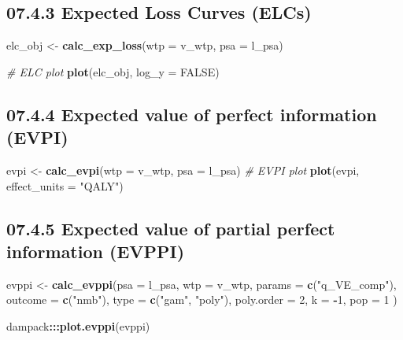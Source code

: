 \documentclass[]{article}
\newenvironment{Shaded}{\begin{snugshade}}{\end{snugshade}}
\newcommand{\KeywordTok}[1]{\textcolor[rgb]{0.13,0.29,0.53}{\textbf{#1}}}
\newcommand{\DataTypeTok}[1]{\textcolor[rgb]{0.13,0.29,0.53}{#1}}
\newcommand{\DecValTok}[1]{\textcolor[rgb]{0.00,0.00,0.81}{#1}}
\newcommand{\StringTok}[1]{\textcolor[rgb]{0.31,0.60,0.02}{#1}}
\newcommand{\CommentTok}[1]{\textcolor[rgb]{0.56,0.35,0.01}{\textit{#1}}}
\newcommand{\OtherTok}[1]{\textcolor[rgb]{0.56,0.35,0.01}{#1}}
\newcommand{\OperatorTok}[1]{\textcolor[rgb]{0.81,0.36,0.00}{\textbf{#1}}}
\newcommand{\NormalTok}[1]{#1}
\begin{document}
\subsection{07.4.3 Expected Loss Curves
(ELCs)}\label{expected-loss-curves-elcs}

\begin{Shaded}
\begin{Highlighting}[]
\NormalTok{elc_obj <-}\StringTok{ }\KeywordTok{calc_exp_loss}\NormalTok{(}\DataTypeTok{wtp =}\NormalTok{ v_wtp, }\DataTypeTok{psa =}\NormalTok{ l_psa)}

\CommentTok{# ELC plot}
\KeywordTok{plot}\NormalTok{(elc_obj, }\DataTypeTok{log_y =} \OtherTok{FALSE}\NormalTok{)}
\end{Highlighting}
\end{Shaded}

\subsection{07.4.4 Expected value of perfect information
(EVPI)}\label{expected-value-of-perfect-information-evpi}

\begin{Shaded}
\begin{Highlighting}[]
\NormalTok{evpi <-}\StringTok{ }\KeywordTok{calc_evpi}\NormalTok{(}\DataTypeTok{wtp =}\NormalTok{ v_wtp, }\DataTypeTok{psa =}\NormalTok{ l_psa)}
\CommentTok{# EVPI plot}
\KeywordTok{plot}\NormalTok{(evpi, }\DataTypeTok{effect_units =} \StringTok{"QALY"}\NormalTok{) }
\end{Highlighting}
\end{Shaded}

\subsection{07.4.5 Expected value of partial perfect information
(EVPPI)}\label{expected-value-of-partial-perfect-information-evppi}

\begin{Shaded}
\begin{Highlighting}[]
\NormalTok{evppi <-}\StringTok{ }\KeywordTok{calc_evppi}\NormalTok{(}\DataTypeTok{psa =}\NormalTok{ l_psa, }
                    \DataTypeTok{wtp =}\NormalTok{ v_wtp, }
                    \DataTypeTok{params =} \KeywordTok{c}\NormalTok{(}\StringTok{"q_VE_comp"}\NormalTok{), }
                    \DataTypeTok{outcome =} \KeywordTok{c}\NormalTok{(}\StringTok{"nmb"}\NormalTok{),}
                    \DataTypeTok{type =} \KeywordTok{c}\NormalTok{(}\StringTok{"gam"}\NormalTok{, }\StringTok{"poly"}\NormalTok{),}
                    \DataTypeTok{poly.order =} \DecValTok{2}\NormalTok{,}
                    \DataTypeTok{k =} \OperatorTok{-}\DecValTok{1}\NormalTok{,}
                    \DataTypeTok{pop =} \DecValTok{1}
\NormalTok{)}

\NormalTok{dampack}\OperatorTok{:::}\KeywordTok{plot.evppi}\NormalTok{(evppi)}
\end{Highlighting}
\end{Shaded}
\end{document}
